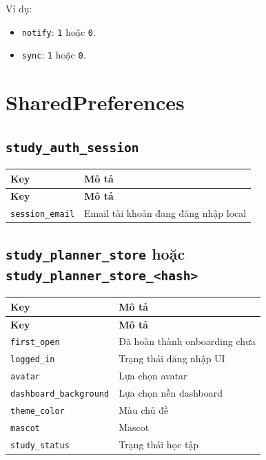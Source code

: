 \documentclass[12pt,a4paper]{report}
\begin{document}
Ví dụ:

\begin{itemize}
\item \texttt{notify}: \texttt{1} hoặc \texttt{0}.
\item \texttt{sync}: \texttt{1} hoặc \texttt{0}.
\end{itemize}

\section{SharedPreferences}

\subsection{\texttt{study\_auth\_session}}

\begin{longtable}{|>{\raggedright\arraybackslash}p{}|>{\raggedright\arraybackslash}p{}|}
\hline
\textbf{Key} & \textbf{Mô tả} \\ \hline
\endfirsthead
\hline
\textbf{Key} & \textbf{Mô tả} \\ \hline
\endhead
\texttt{session\_email} & Email tài khoản đang đăng nhập local \\ \hline
\end{longtable}

\subsection{\texttt{study\_planner\_store} hoặc \texttt{study\_planner\_store\_\textless{}hash\textgreater{}}}

\begin{longtable}{|>{\raggedright\arraybackslash}p{}|>{\raggedright\arraybackslash}p{}|}
\hline
\textbf{Key} & \textbf{Mô tả} \\ \hline
\endfirsthead
\hline
\textbf{Key} & \textbf{Mô tả} \\ \hline
\endhead
\texttt{first\_open} & Đã hoàn thành onboarding chưa \\ \hline
\texttt{logged\_in} & Trạng thái đăng nhập UI \\ \hline
\texttt{avatar} & Lựa chọn avatar \\ \hline
\texttt{dashboard\_background} & Lựa chọn nền dashboard \\ \hline
\texttt{theme\_color} & Màu chủ đề \\ \hline
\texttt{mascot} & Mascot \\ \hline
\texttt{study\_status} & Trạng thái học tập \\ \hline
\end{longtable}
\end{document}
